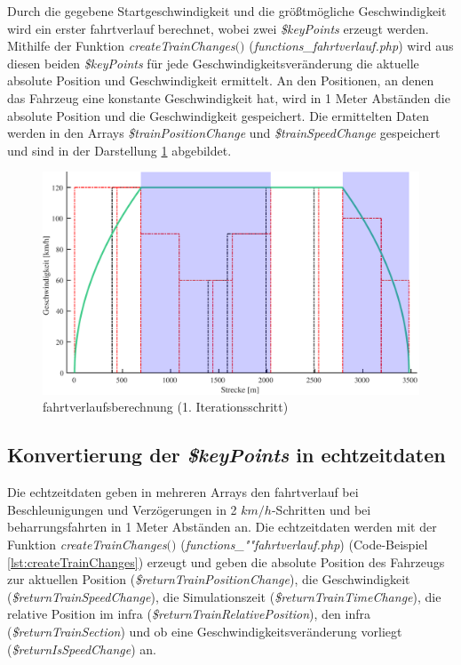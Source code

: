 Durch die gegebene Startgeschwindigkeit und die größtmögliche Geschwindigkeit wird ein erster \Gls{fahrtverlauf} berechnet, wobei zwei \textit{\$keyPoints} erzeugt werden. Mithilfe der Funktion \textit{createTrainChanges$($$)$} (\textit{functions\_fahrtverlauf.php}) wird aus diesen beiden \textit{\$keyPoints} für jede Geschwindigkeitsveränderung die aktuelle absolute Position und Geschwindigkeit ermittelt. An den Positionen, an denen das Fahrzeug eine konstante Geschwindigkeit hat, wird in 1 Meter Abständen die absolute Position und die Geschwindigkeit gespeichert. Die ermittelten Daten werden in den Arrays \textit{\$trainPositionChange} und \textit{\$trainSpeedChange} gespeichert und sind in der Darstellung \ref{fig:it3} abgebildet.
\begin{figure}
\includegraphics[width=\linewidth]{../images/matlab/it3.pdf}
\caption{\Gls{fahrtverlauf}sberechnung (1. Iterationsschritt)}
\label{fig:it3}
\end{figure}
\subsection{Konvertierung der \textit{\$keyPoints} in \Gls{echtzeitdaten}} \label{keypointumwandlung}
Die \Gls{echtzeitdaten} geben in mehreren Arrays den \Gls{fahrtverlauf} bei Beschleunigungen und Verzögerungen in 2 $km/h$-Schritten und bei \Gls{beharrungsfahrt}en in 1 Meter Abständen an. Die \Gls{echtzeitdaten} werden mit der Funktion \textit{createTrainChanges$($$)$} (\textit{func\-tions\_""fahrt\-ver\-lauf.php}) (Code-Beispiel \ref{lst:createTrainChanges}) erzeugt und geben die absolute Position des Fahrzeugs zur aktuellen Position (\textit{\$returnTrainPositionChange}), die Geschwindigkeit (\textit{\$returnTrainSpeedChange}), die Simulationszeit (\textit{\$returnTrainTimeChange}), die relative Position im \ac{infra} (\textit{\$returnTrainRelativePosition}), den \ac{infra} (\textit{\$returnTrainSection}) und ob eine Geschwindigkeitsveränderung vorliegt (\textit{\$return\-Is\-SpeedChange}) an.

